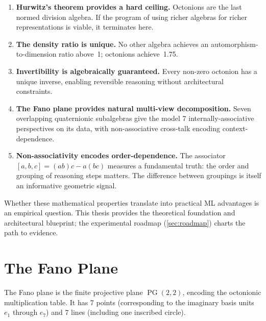 \documentclass[11pt,a4paper]{article}
\DeclareMathOperator{\PG}{PG}
\begin{document}
\begin{enumerate}
  \item \textbf{Hurwitz's theorem provides a hard ceiling.} Octonions are the last normed division algebra. If the program of using richer algebras for richer representations is viable, it terminates here.

  \item \textbf{The density ratio is unique.} No other algebra achieves an automorphism-to-dimension ratio above~1; octonions achieve~1.75.

  \item \textbf{Invertibility is algebraically guaranteed.} Every non-zero octonion has a unique inverse, enabling reversible reasoning without architectural constraints.

  \item \textbf{The Fano plane provides natural multi-view decomposition.} Seven overlapping quaternionic subalgebras give the model 7 internally-associative perspectives on its data, with non-associative cross-talk encoding context-dependence.

  \item \textbf{Non-associativity encodes order-dependence.} The associator $[a,b,c] = (ab)c - a(bc)$ measures a fundamental truth: the order and grouping of reasoning steps matters. The difference between groupings is itself an informative geometric signal.
\end{enumerate}

Whether these mathematical properties translate into practical ML advantages is an empirical question. This thesis provides the theoretical foundation and architectural blueprint; the experimental roadmap (\cref{sec:roadmap}) charts the path to evidence.




\appendix

\section{The Fano Plane}
\label{app:fano}

The Fano plane is the finite projective plane $\PG(2,2)$, encoding the octonionic multiplication table. It has 7 points (corresponding to the imaginary basis units $e_1$ through $e_7$) and 7 lines (including one inscribed circle).
\end{document}
